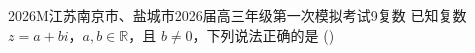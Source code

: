 
\begin{problem}{2026}{M}{江苏南京市、盐城市2026届高三年级第一次模拟考试}{9}{复数}
已知复数 $z=a+bi$，$a,b\in\mathbb{R}$，且 $b\ne0$，下列说法正确的是
(\hspace{1cm})
\begin{choices}
\end{choices}
\end{problem}